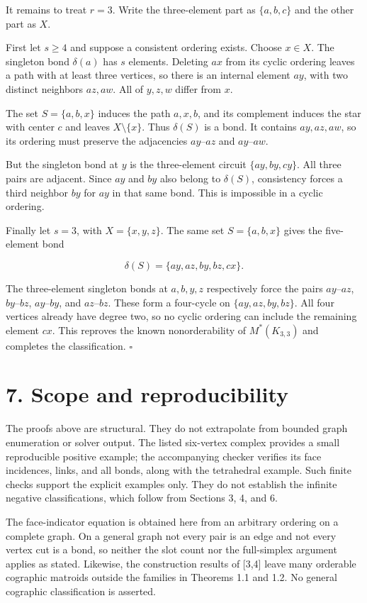 \documentclass[11pt]{article}
\begin{document}
It remains to treat $r=3$. Write the three-element part as $\{a,b,c\}$ and the other part as $X$.

First let $s\ge4$ and suppose a consistent ordering exists. Choose $x\in X$. The singleton bond $\delta(a)$ has $s$ elements. Deleting $ax$ from its cyclic ordering leaves a path with at least three vertices, so there is an internal element $ay$, with two distinct neighbors $az,aw$. All of $y,z,w$ differ from $x$.

The set $S=\{a,b,x\}$ induces the path $a,x,b$, and its complement induces the star with center $c$ and leaves $X\setminus\{x\}$. Thus $\delta(S)$ is a bond. It contains $ay,az,aw$, so its ordering must preserve the adjacencies $ay$--$az$ and $ay$--$aw$.

But the singleton bond at $y$ is the three-element circuit $\{ay,by,cy\}$. All three pairs are adjacent. Since $ay$ and $by$ also belong to $\delta(S)$, consistency forces a third neighbor $by$ for $ay$ in that same bond. This is impossible in a cyclic ordering.

Finally let $s=3$, with $X=\{x,y,z\}$. The same set $S=\{a,b,x\}$ gives the five-element bond

\[
\delta(S)=\{ay,az,by,bz,cx\}.
\]

The three-element singleton bonds at $a,b,y,z$ respectively force the pairs $ay$--$az$, $by$--$bz$, $ay$--$by$, and $az$--$bz$. These form a four-cycle on $\{ay,az,by,bz\}$. All four vertices already have degree two, so no cyclic ordering can include the remaining element $cx$. This reproves the known nonorderability of $M^*(K_{3,3})$ and completes the classification. $\square$

\section*{7. Scope and reproducibility}

The proofs above are structural. They do not extrapolate from bounded graph enumeration or solver output. The listed six-vertex complex provides a small reproducible positive example; the accompanying checker verifies its face incidences, links, and all bonds, along with the tetrahedral example. Such finite checks support the explicit examples only. They do not establish the infinite negative classifications, which follow from Sections 3, 4, and 6.

The face-indicator equation is obtained here from an arbitrary ordering on a complete graph. On a general graph not every pair is an edge and not every vertex cut is a bond, so neither the slot count nor the full-simplex argument applies as stated. Likewise, the construction results of [3,4] leave many orderable cographic matroids outside the families in Theorems 1.1 and 1.2. No general cographic classification is asserted.
\end{document}
